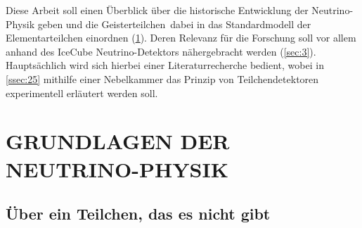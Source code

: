\documentclass[a4paper,12pt]{article}
\begin{document}
Diese Arbeit soll einen Überblick über die historische Entwicklung der Neutrino-Physik geben und die \glqq Geisterteilchen\grqq \ dabei in das Standardmodell der Elementarteilchen einordnen (\cref{sec:2}). Deren Relevanz für die Forschung soll vor allem anhand des IceCube Neutrino-Detektors nähergebracht werden (\cref{sec:3}). Hauptsächlich wird sich hierbei einer Literaturrecherche bedient, wobei in \cref{ssec:25} mithilfe einer Nebelkammer das Prinzip von Teilchendetektoren experimentell erläutert werden soll.


 

\newpage




\section{GRUNDLAGEN DER NEUTRINO-PHYSIK} \label{sec:2}

\subsection{Über ein Teilchen, das es nicht gibt} \label{ssec:21}
\end{document}
